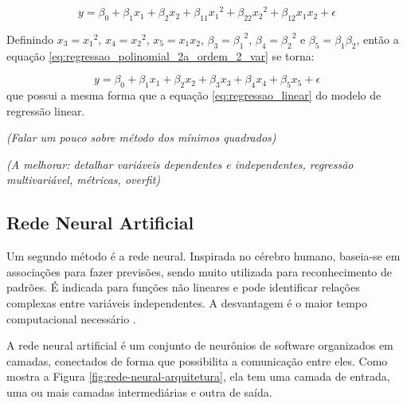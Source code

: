 \documentclass[brazil,tf,epusp]{usp}  %
\begin{document}
\begin{equation}
  y = \beta_0 + \beta_1 x_1 + \beta_2 x_2 + \beta_{11} {x_1}^2 + \beta_{22} {x_2}^2 + \beta_{12} x_1 x_2 + \epsilon
  \label{eq:regressao_polinomial_2a_ordem_2_var}
\end{equation}

Definindo $x_3 = {x_1}^2$, $x_4 = {x_2}^2$, $x_5 = x_1 x_2$, $\beta_3 = {\beta_1}^2$, $\beta_4 = {\beta_2}^2$ e $\beta_5 = \beta_1 \beta_2$, então a equação \ref{eq:regressao_polinomial_2a_ordem_2_var} se torna:

\begin{equation}
  y = \beta_0 + \beta_1 x_1 + \beta_2 x_2 + \beta_3 x_3 + \beta_4 x_4 + \beta_5 x_5 + \epsilon 
\end{equation}
%
que possui a mesma forma que a equação \ref{eq:regressao_linear} do modelo de regressão linear.

\textit{(Falar um pouco sobre método dos mínimos quadrados)}



\textit{(A melhorar: detalhar variáveis dependentes e independentes, regressão multivariável, métricas, overfit)}

\subsection{Rede Neural Artificial}
Um segundo método é a rede neural. Inspirada no cérebro humano, baseia-se em associações para fazer previsões, sendo muito utilizada para reconhecimento de padrões. É indicada para funções não lineares e pode identificar relações complexas entre variáveis independentes. A desvantagem é o maior tempo computacional necessário \cite{Belisle2015}.

A rede neural artificial é um conjunto de neurônios de software organizados em camadas, conectados de forma que possibilita a comunicação entre eles. Como mostra a Figura \ref{fig:rede-neural-arquitetura}, ela tem uma camada de entrada, uma ou mais camadas intermediárias e outra de saída.
\end{document}
